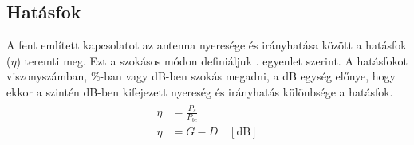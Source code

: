 		\subsection{Hatásfok}
			A fent említett kapcsolatot az antenna nyeresége és irányhatása között a hatásfok ($\eta$) teremti meg. Ezt a szokásos módon definiáljuk . egyenlet szerint. A hatásfokot viszonyszámban, \%-ban vagy dB-ben szokás megadni, a dB egység előnye, hogy ekkor a szintén dB-ben kifejezett nyereség és irányhatás különbsége a hatásfok.
		\begin{align}
			\begin{split}\label{equ:eta}
				\eta & = \frac{P_{s}}{P_{be}} \\
				\eta & = G - D \quad [\text{dB}]
			\end{split}
		\end{align}
